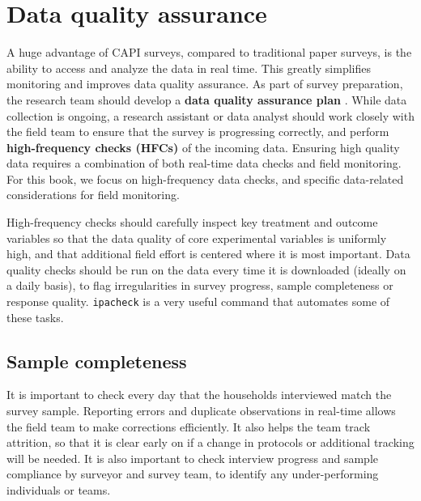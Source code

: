 \section{Data quality assurance}

A huge advantage of CAPI surveys, compared to traditional paper surveys, is the ability to access and analyze the data in real time. 
This greatly simplifies monitoring and improves data quality assurance. As part of survey preparation, the research team should develop a 
\textbf{data quality assurance plan} . While data collection is ongoing, a research assistant or data analyst should work closely with the field team to ensure that the survey is progressing correctly, and perform \textbf{high-frequency checks (HFCs)} of the incoming data. 
Ensuring high quality data requires a combination of both real-time data checks and field monitoring. For this book, we focus on high-frequency data checks, and specific data-related considerations for field monitoring.

High-frequency checks should carefully inspect key treatment and outcome variables so that the data quality of core experimental variables is uniformly high,
and that additional field effort is centered where it is most important. Data quality checks should be run on the data every time it is downloaded (ideally on a daily basis), to flag irregularities in survey progress, sample completeness or response quality.
\texttt{ipacheck} 
is a very useful command that automates some of these tasks.

\subsection{Sample completeness}
It is important to check every day that the households interviewed match the survey sample. Reporting errors and duplicate observations in real-time allows the field team to make corrections efficiently.
It also helps the team track attrition, so that it is clear early on if a change in protocols or additional tracking will be needed. It is also important to check interview progress and sample compliance by surveyor and survey team, to identify any under-performing individuals or teams. 

